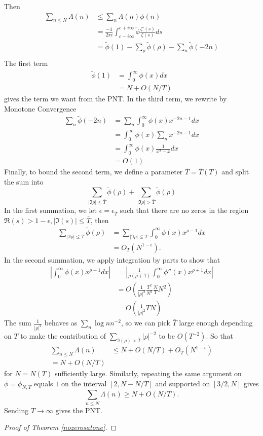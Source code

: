 Then \begin{align*}
    \sum_{n\leq N}\Lambda(n) &\leq \sum_{n} \Lambda(n)\phi(n)\\
    &= \frac{-1}{2\pi i}\int_{c-i\infty}^{c+i\infty}\tilde{\phi}\frac{\zeta'(s)}{\zeta(s)}ds\\
    &= \tilde{\phi}(1) - \sum_{\rho} \tilde{\phi}(\rho) - \sum_{n} \tilde{\phi}(-2n)\\
\end{align*}
The first term \begin{align*}
    \tilde{\phi}(1) &= \int_{0}^{\infty} \phi(x) dx \\
    &= N+ O(N/T) 
\end{align*}
gives the term we want from the PNT. In the third term, we rewrite by Monotone Convergence \begin{align*}
    \sum_{n} \tilde{\phi}(-2n) &= \sum_{n} \int_{0}^{\infty} \phi(x) x^{-2n-1} dx \\
    &=\int_{0}^{\infty} \phi(x) \sum_{n} x^{-2n-1} dx \\
    &= \int_{0}^{\infty} \phi(x) \frac{1}{x^3-x} dx \\
    &= O(1)
\end{align*} 
Finally, to bound the second term, we define a parameter $\bar{T} = \bar{T}(T)$ and split the sum into\[
\sum_{|\Im{\rho}|\leq \bar{T}}\tilde{\phi}(\rho) + \sum_{|\Im{\rho}| > \bar{T}}\tilde{\phi}(\rho)
\]
In the first summation, we let $\epsilon = \epsilon_{\bar{T}}$ 
such that there are no zeros in the region
$\Re({s})>1-\epsilon, |\Im{(s)}|\leq \bar{T}$, then \begin{align*}
    \sum_{|\Im{\rho}|\leq \bar{T}}\tilde{\phi}(\rho) &= \sum_{|\Im{\rho}|\leq \bar{T}} \int_{0}^{\infty}\phi(x)x^{\rho-1}dx\\
    &= O_{T}(N^{1-\epsilon}).
\end{align*}
In the second summation, we apply integration by parts to show that \begin{align*}
    |\int_{0}^{\infty}\phi(x)x^{\rho-1}dx| &= |\frac{1}{\rho(\rho+1)}\int_{0}^{\infty}\phi''(x)x^{\rho+1}dx|\\
    &= O(\frac{1}{|\rho|^2} \frac{T^2}{N^2} \frac{N}{T} N^2)\\
    &=O(\frac{1}{|\rho|^2} TN)
\end{align*}
The sum $\frac{1}{|\rho|^2}$ behaves as $\sum_n \log n n^{-2}$, so we can pick $\bar{T}$ large enough depending on $T$
to make the contribution of $\sum_{\Im(\rho)>\bar{T}} |\rho|^{-2}$ to be $O(T^{-2})$.
So that 
\begin{align*}
    \sum_{n\leq N}\Lambda(n)&\leq N +O(N/T)+ O_T(N^{1-\epsilon})\\
    = N+O(N/T)
\end{align*}
for $N=N(T)$ sufficiently large.
Similarly, repeating the same argument on $\phi=\phi_{N,T}$ equals $1$ on the interval $[2,N-N/T]$ and supported on $[3/2, N]$
gives \[
    \sum_{n\leq N}\Lambda(n)\geq N+O(N/T).
\]
Sending $T\to\infty$ gives the PNT.
\begin{proof}[Proof of Theorem \ref{nozerosatone}]
    
\end{proof}
